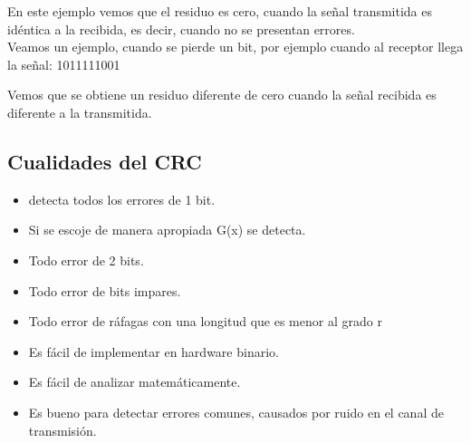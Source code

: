 En este ejemplo vemos que el residuo es cero, cuando la señal transmitida es idéntica a la recibida, es decir, cuando no se presentan errores. \\
Veamos un ejemplo, cuando se pierde un bit, por ejemplo cuando al receptor llega la señal: 1011111001

\begin{table}[h!]
	\centering
\end{table}

Vemos que se obtiene un residuo diferente de cero cuando la señal recibida es diferente a la transmitida.

\subsection{Cualidades del CRC}

\begin{itemize}
 \item detecta todos los errores de 1 bit.
 \item Si se escoje de manera apropiada G(x) se detecta.
 \item Todo error de 2 bits.
 \item Todo error de bits impares.
 \item Todo error de ráfagas con una longitud que es menor al grado r
 \item Es fácil de implementar en hardware binario.
 \item Es fácil de analizar matemáticamente.
 \item Es bueno para detectar errores comunes, causados por ruido en el canal de transmisión.
\end{itemize}

